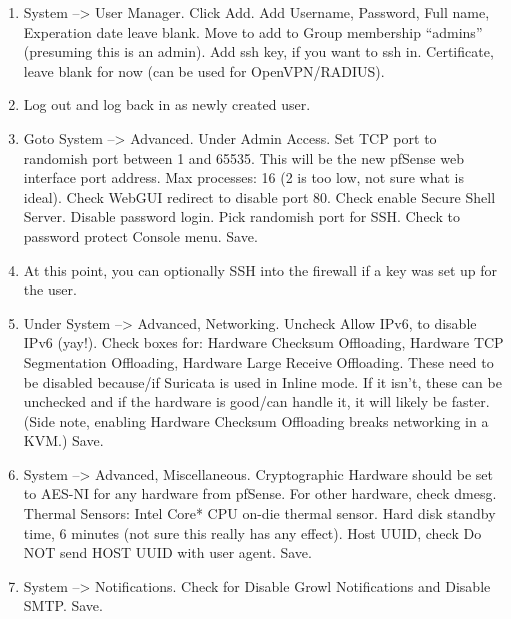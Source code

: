 \begin{enumerate}
 \item System --> User Manager. Click Add. Add Username, Password, Full name, Experation date leave blank. Move to add to Group membership ``admins'' (presuming this is an admin). Add ssh key, if you want to ssh in. Certificate, leave blank for now (can be used for OpenVPN/RADIUS). 
 \item Log out and log back in as newly created user.
 \item Goto System --> Advanced. Under Admin Access. Set TCP port to randomish port between 1 and 65535. This will be the new pfSense web interface port address. Max processes: 16 (2 is too low, not sure what is ideal). Check WebGUI redirect to disable port 80. Check enable Secure Shell Server. Disable password login. Pick randomish port for SSH. Check to password protect Console menu. Save.
 \item At this point, you can optionally SSH into the firewall if a key was set up for the user.
 \item Under System --> Advanced, Networking. Uncheck Allow IPv6, to disable IPv6 (yay!). Check boxes for: Hardware Checksum Offloading, Hardware TCP Segmentation Offloading, Hardware Large Receive Offloading. These need to be disabled because/if Suricata is used in Inline mode. If it isn't, these can be unchecked and if the hardware is good/can handle it, it will likely be faster. (Side note, enabling Hardware Checksum Offloading breaks networking in a KVM.) Save.
 \item System --> Advanced, Miscellaneous. Cryptographic Hardware should be set to AES-NI for any hardware from pfSense. For other hardware, check dmesg. Thermal Sensors: Intel Core* CPU on-die thermal sensor. Hard disk standby time, 6 minutes (not sure this really has any effect). Host UUID, check Do NOT send HOST UUID with user agent. Save.
 \item System --> Notifications. Check for Disable Growl Notifications and Disable SMTP. Save.
\end{enumerate}

